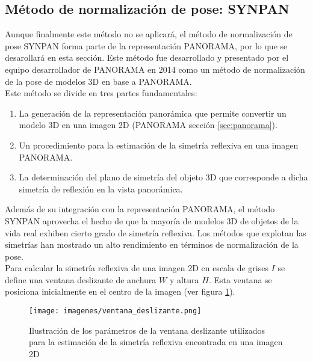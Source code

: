 \subsection{Método de normalización de pose: SYNPAN}
Aunque finalmente este método no se aplicará, el método de normalización de pose SYNPAN \cite{sfikas2014pose} forma parte de la representación PANORAMA, por lo que se desarollará en esta sección. Este método fue desarrollado y presentado por el equipo desarrollador de PANORAMA en 2014 como un método de normalización de la pose de modelos 3D en base a PANORAMA.\\

Este método se divide en tres partes fundamentales:
\begin{enumerate}
    \item La generación de la representación panorámica que permite convertir un modelo 3D en una imagen 2D (PANORAMA sección \ref{sec:panorama}).
    \item Un procedimiento para la estimación de la simetría reflexiva en una imagen PANORAMA.
    \item La determinación del plano de simetría del objeto 3D que corresponde a dicha simetría de reflexión en la vista panorámica.
\end{enumerate}

Además de su integración con la representación PANORAMA, el método SYNPAN aprovecha el hecho de que la mayoría de modelos 3D de objetos de la vida real exhiben cierto grado de simetría reflexiva. Los métodos que explotan las simetrías han mostrado un alto rendimiento en términos de normalización de la pose\cite{sfikas2011rosy+,kazhdan2002reflective,chaouch2009alignment}.\\


Para calcular la simetría reflexiva de una imagen 2D en escala de grises $I$ se define una ventana deslizante de anchura $W$ y altura $H$. Esta ventana se posiciona inicialmente en el centro de la imagen (ver figura \ref{fig:ventana_deslizante}). 

\begin{figure}[ht]
    \centering
    \texttt{[image: imagenes/ventana\_deslizante.png]}
    \caption{Ilustración de los parámetros de la ventana deslizante utilizados para la estimación de la simetría reflexiva encontrada en una imagen 2D}
    \label{fig:ventana_deslizante}
\end{figure}

